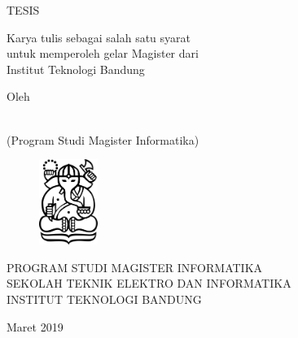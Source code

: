 \clearpage
\pagestyle{empty}

\begin{center}
\smallskip
	
	\bfseries \begin{spacing}{1}
    \Large \MakeUppercase{\thetitle}
    \end{spacing}
    \vfill

    \Large \MakeUppercase{Tesis}
	
	\begin{spacing}{1}
    \large
    	Karya tulis sebagai salah satu syarat \\
    	untuk memperoleh gelar Magister dari \\
    	Institut Teknologi Bandung
    \vfill
    \end{spacing}

    \large Oleh
    
    \begin{spacing}{1}
		\Large \MakeUppercase \theauthor \\
		(Program Studi Magister Informatika)  
    \end{spacing}

    \vfill
    \begin{figure}[h]
        \centering
      	\includegraphics[width=0.17\textwidth]{resources/cover-ganesha.jpg}
    \end{figure}
    \vfill

    \large
    \uppercase{
        Program Studi Magister Informatika \\
        Sekolah Teknik Elektro dan Informatika \\
        Institut Teknologi Bandung
    }

    Maret 2019

\end{center}

\clearpage

